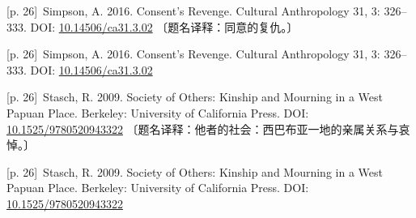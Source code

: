 \documentclass[10pt,a4paper]{article}
\begin{document}
\noindent\begin{minipage}{\textwidth}\begin{minipage}[t]{\dimexpr.5\textwidth-4mm\relax}\noindent\begin{minipage}[t]{\linewidth}{\scriptsize\color{gray} [p. 26]}\ Simpson, A. 2016. Consent’s Revenge. Cultural Anthropology 31, 3: 326–333. DOI: \url{10.14506/ca31.3.02} 〔题名译释：同意的复仇。〕\par\end{minipage}\par\end{minipage}\hfill\begin{minipage}[t]{\dimexpr.5\textwidth-4mm\relax}\noindent\begin{minipage}[t]{\linewidth}{\scriptsize\color{gray} [p. 26]}\ Simpson, A. 2016. Consent’s Revenge. Cultural Anthropology 31, 3: 326–333. DOI: \url{10.14506/ca31.3.02}\par\end{minipage}\par\end{minipage}\end{minipage}\par
\noindent\begin{minipage}{\textwidth}\begin{minipage}[t]{\dimexpr.5\textwidth-4mm\relax}\noindent\begin{minipage}[t]{\linewidth}{\scriptsize\color{gray} [p. 26]}\ Stasch, R. 2009. Society of Others: Kinship and Mourning in a West Papuan Place. Berkeley: University of California Press. DOI: \url{10.1525/9780520943322} 〔题名译释：他者的社会：西巴布亚一地的亲属关系与哀悼。〕\par\end{minipage}\par\end{minipage}\hfill\begin{minipage}[t]{\dimexpr.5\textwidth-4mm\relax}\noindent\begin{minipage}[t]{\linewidth}{\scriptsize\color{gray} [p. 26]}\ Stasch, R. 2009. Society of Others: Kinship and Mourning in a West Papuan Place. Berkeley: University of California Press. DOI: \url{10.1525/9780520943322}\par\end{minipage}\par\end{minipage}\end{minipage}\par
\end{document}
